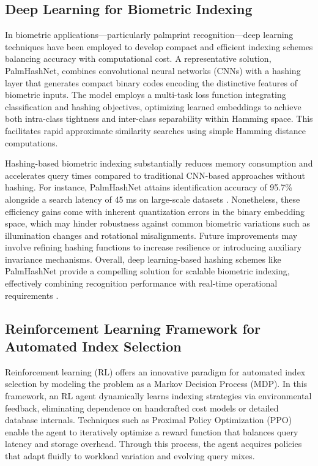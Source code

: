 \documentclass[11pt]{article}
\begin{document}
\subsection{Deep Learning for Biometric Indexing}

In biometric applications—particularly palmprint recognition—deep learning techniques have been employed to develop compact and efficient indexing schemes balancing accuracy with computational cost. A representative solution, PalmHashNet, combines convolutional neural networks (CNNs) with a hashing layer that generates compact binary codes encoding the distinctive features of biometric inputs. The model employs a multi-task loss function integrating classification and hashing objectives, optimizing learned embeddings to achieve both intra-class tightness and inter-class separability within Hamming space. This facilitates rapid approximate similarity searches using simple Hamming distance computations.

Hashing-based biometric indexing substantially reduces memory consumption and accelerates query times compared to traditional CNN-based approaches without hashing. For instance, PalmHashNet attains identification accuracy of 95.7\% alongside a search latency of 45 ms on large-scale datasets \cite{ref32}. Nonetheless, these efficiency gains come with inherent quantization errors in the binary embedding space, which may hinder robustness against common biometric variations such as illumination changes and rotational misalignments. Future improvements may involve refining hashing functions to increase resilience or introducing auxiliary invariance mechanisms. Overall, deep learning-based hashing schemes like PalmHashNet provide a compelling solution for scalable biometric indexing, effectively combining recognition performance with real-time operational requirements \cite{ref32}.

\subsection{Reinforcement Learning Framework for Automated Index Selection}

Reinforcement learning (RL) offers an innovative paradigm for automated index selection by modeling the problem as a Markov Decision Process (MDP). In this framework, an RL agent dynamically learns indexing strategies via environmental feedback, eliminating dependence on handcrafted cost models or detailed database internals. Techniques such as Proximal Policy Optimization (PPO) enable the agent to iteratively optimize a reward function that balances query latency and storage overhead. Through this process, the agent acquires policies that adapt fluidly to workload variation and evolving query mixes.
\end{document}
